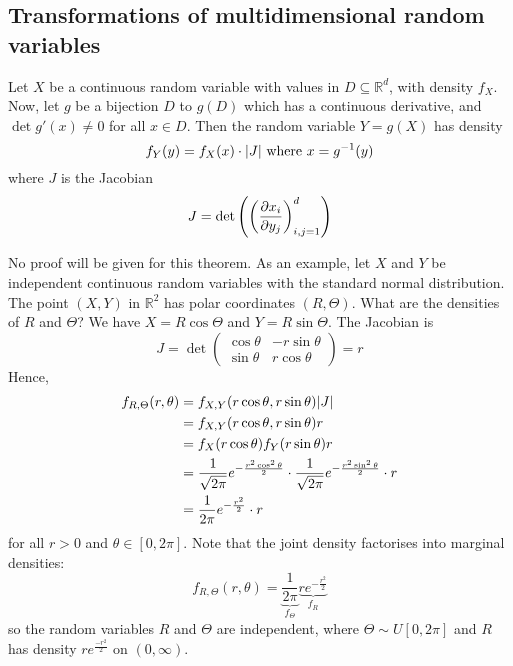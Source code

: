 \subsection{Transformations of multidimensional random variables}
\begin{theorem}
	Let \(X\) be a continuous random variable with values in \(D \subseteq \mathbb R^d\), with density \(f_X\).
	Now, let \(g\) be a bijection \(D\) to \(g(D)\) which has a continuous derivative, and \(\det g'(x) \neq 0\) for all \(x \in D\).
	Then the random variable \(Y = g(X)\) has density
	\[
		f_Y(y) = f_X(x) \cdot \abs{J} \text{ where } x = g^{-1}(y)
	\]
	where \(J\) is the Jacobian
	\[
		J = \det \left( \left( \pdv{x_i}{y_j} \right)_{i, j = 1}^d \right)
	\]
\end{theorem}
No proof will be given for this theorem.
As an example, let \(X\) and \(Y\) be independent continuous random variables with the standard normal distribution.
The point \((X, Y)\) in \(\mathbb R^2\) has polar coordinates \((R, \Theta)\).
What are the densities of \(R\) and \(\Theta\)?
We have \(X = R\cos\Theta\) and \(Y = R\sin\Theta\).
The Jacobian is
\[
	J = \det\begin{pmatrix}
		\cos\theta & -r\sin\theta \\
		\sin\theta & r\cos\theta
	\end{pmatrix} = r
\]
Hence,
\begin{align*}
	f_{R, \Theta}(r, \theta) & = f_{X, Y}(r\cos\theta, r\sin\theta) \abs{J}                                                                            \\
	                         & = f_{X, Y}(r\cos\theta, r\sin\theta) r                                                                                  \\
	                         & = f_X(r\cos\theta) f_Y(r\sin\theta) r                                                                                   \\
	                         & = \frac{1}{\sqrt{2\pi}}e^{-\frac{r^2\cos^2\theta}{2}} \cdot \frac{1}{\sqrt{2\pi}}e^{-\frac{r^2\sin^2\theta}{2}} \cdot r \\
	                         & = \frac{1}{2\pi}e^{-\frac{r^2}{2}} \cdot r
\end{align*}
for all \(r > 0\) and \(\theta \in [0, 2\pi]\).
Note that the joint density factorises into marginal densities:
\[
	f_{R, \Theta}(r, \theta) = \underbrace{\frac{1}{2\pi}}_{f_\Theta} \underbrace{re^{-\frac{r^2}{2}}}_{f_R}
\]
so the random variables \(R\) and \(\Theta\) are independent, where \(\Theta \sim U[0, 2\pi]\) and \(R\) has density \(re^{\frac{-r^2}{2}}\) on \((0, \infty)\).

